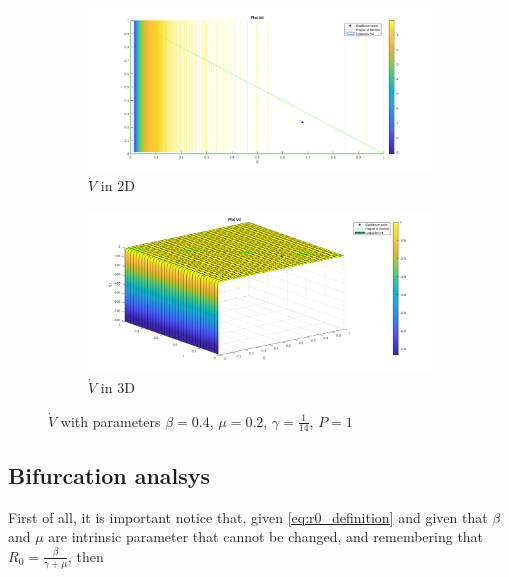 \begin{figure}[h!]
    \centering
    \label{fig:lyapunov_derivative_r0_major_1}
    \begin{subfigure}{\textwidth}
        \centering
        \includegraphics[width=\linewidth]{Figure/lyapunov_derivative_2d_R0_major_1.png}  
        \caption{$\dot{V}$ in 2D}
        \label{fig:lyapunov_derivative_r0_major_1_first}
    \end{subfigure}
    \begin{subfigure}{\textwidth}
        \centering
        \includegraphics[width=\linewidth]{Figure/lyapunov_derivative_3d_R0_major_1.png}  
        \caption{$\dot{V}$ in 3D}
        \label{fig:lyapunov_derivative_r0_major_1_second}
    \end{subfigure}
    \caption{$\dot{V}$ with parameters $\beta = 0.4$, $\mu = 0.2$, $\gamma = \frac{1}{14}$, $P = 1$}
\end{figure}

\subsection{Bifurcation analsys}

First of all, it is important notice that, given \ref{eq:r0_definition} and given that $\beta$ and $\mu$ are intrinsic parameter that cannot be changed, and remembering that $R_0 = \frac{\beta}{\gamma + \mu}$, then

